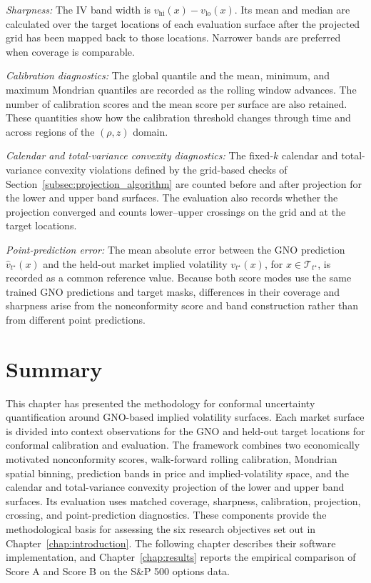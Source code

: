 \textit{Sharpness:} The IV band width is $v_{\text{hi}}(x)-v_{\text{lo}}(x)$. Its mean and median are calculated over the target locations of each evaluation surface after the projected grid has been mapped back to those locations. Narrower bands are preferred when coverage is comparable.

\textit{Calibration diagnostics:} The global quantile and the mean, minimum, and maximum Mondrian quantiles are recorded as the rolling window advances. The number of calibration scores and the mean score per surface are also retained. These quantities show how the calibration threshold changes through time and across regions of the $(\rho,z)$ domain.

\textit{Calendar and total-variance convexity diagnostics:} The fixed-$k$ calendar and total-variance convexity violations defined by the grid-based checks of Section~\ref{subsec:projection_algorithm} are counted before and after projection for the lower and upper band surfaces. The evaluation also records whether the projection converged and counts lower--upper crossings on the grid and at the target locations.

\textit{Point-prediction error:} The mean absolute error between the GNO prediction $\hat{v}_{t^\star}(x)$ and the held-out market implied volatility $v_{t^\star}(x)$, for $x\in\mathcal{T}_{t^\star}$, is recorded as a common reference value. Because both score modes use the same trained GNO predictions and target masks, differences in their coverage and sharpness arise from the nonconformity score and band construction rather than from different point predictions.

\section{Summary}
\label{sec:meth_summary}

This chapter has presented the methodology for conformal uncertainty quantification around GNO-based implied volatility surfaces. Each market surface is divided into context observations for the GNO and held-out target locations for conformal calibration and evaluation. The framework combines two economically motivated nonconformity scores, walk-forward rolling calibration, Mondrian spatial binning, prediction bands in price and implied-volatility space, and the calendar and total-variance convexity projection of the lower and upper band surfaces. Its evaluation uses matched coverage, sharpness, calibration, projection, crossing, and point-prediction diagnostics. These components provide the methodological basis for assessing the six research objectives set out in Chapter~\ref{chap:introduction}. The following chapter describes their software implementation, and Chapter~\ref{chap:results} reports the empirical comparison of Score A and Score B on the S\&P 500 options data.
